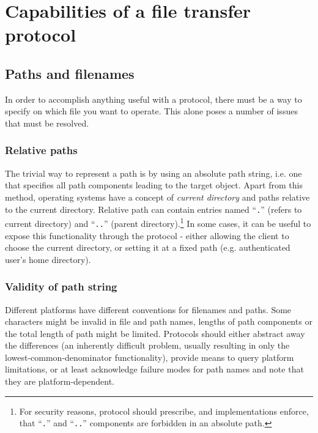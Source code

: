 
\section{Capabilities of a file transfer protocol}

\subsection{Paths and filenames}

In order to accomplish anything useful with a protocol, there must be a way to specify on which file you want
to operate. This alone poses a number of issues that must be resolved.

\subsubsection{Relative paths}

The trivial way to represent a path is by using an absolute path string, i.e. one that specifies all path
components leading to the target object. Apart from this method, operating systems have a concept of {\it
current directory} and paths relative to the current directory. Relative path can contain entries named
``\texttt{.}'' (refers to current directory) and ``\texttt{..}'' (parent directory).\footnote{For security
reasons, protocol should prescribe, and implementations enforce, that ``\texttt{.}'' and ``\texttt{..}''
components are forbidden in an absolute path.} In some cases, it can be useful to expose this functionality
through the protocol - either allowing the client to choose the current directory, or setting it at a fixed
path (e.g.  authenticated user's home directory).

\subsubsection{Validity of path string}

Different platforms have different conventions for filenames and paths. Some characters might be invalid in
file and path names, lengths of path components or the total length of path might be limited. Protocols should
either abstract away the differences (an inherently difficult problem, usually resulting in only the
lowest-common-denominator functionality), provide means to query platform limitations, or at least acknowledge
failure modes for path names and note that they are platform-dependent.

